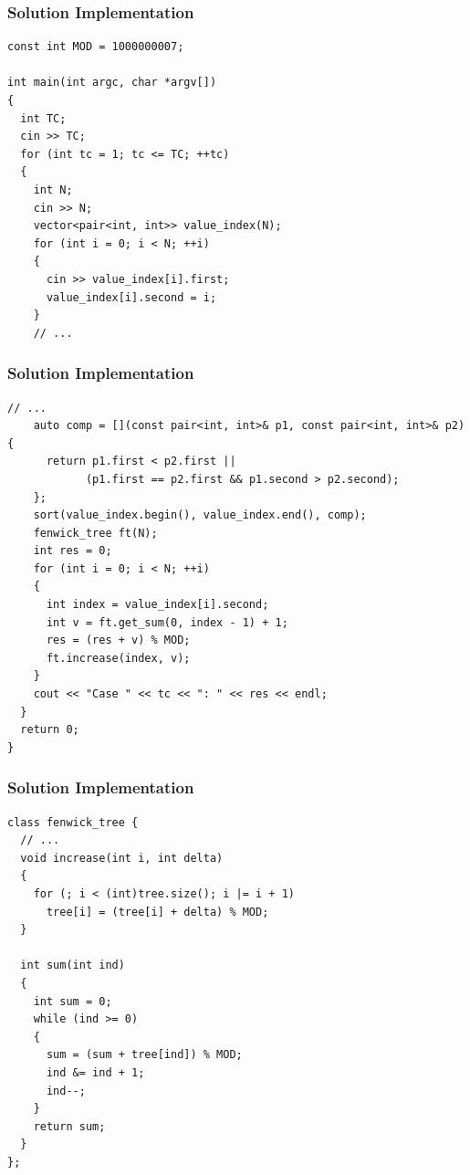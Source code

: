 \documentclass{beamer}
\begin{document}
\begin{frame}[containsverbatim]
\frametitle{Solution Implementation}

\scriptsize

\begin{lstlisting}[mathescape]
const int MOD = 1000000007;

int main(int argc, char *argv[])
{
  int TC;
  cin >> TC;
  for (int tc = 1; tc <= TC; ++tc)
  {
    int N;
    cin >> N;
    vector<pair<int, int>> value_index(N);
    for (int i = 0; i < N; ++i)
    {
      cin >> value_index[i].first;
      value_index[i].second = i;
    }
    // ...
\end{lstlisting}

\end{frame}

\begin{frame}[containsverbatim]
\frametitle{Solution Implementation}

\scriptsize

\begin{lstlisting}[mathescape]
    // ...
    auto comp = [](const pair<int, int>& p1, const pair<int, int>& p2) {
      return p1.first < p2.first ||
            (p1.first == p2.first && p1.second > p2.second);
    };
    sort(value_index.begin(), value_index.end(), comp);
    fenwick_tree ft(N);
    int res = 0;
    for (int i = 0; i < N; ++i)
    {
      int index = value_index[i].second;
      int v = ft.get_sum(0, index - 1) + 1;
      res = (res + v) % MOD;
      ft.increase(index, v);
    }
    cout << "Case " << tc << ": " << res << endl;
  }
  return 0;
}
\end{lstlisting}

\end{frame}

\begin{frame}[containsverbatim]
\frametitle{Solution Implementation}

\scriptsize

\begin{lstlisting}[mathescape]
class fenwick_tree {
  // ...
  void increase(int i, int delta)
  {
    for (; i < (int)tree.size(); i |= i + 1)
      tree[i] = (tree[i] + delta) % MOD;
  }

  int sum(int ind)
  {
    int sum = 0;
    while (ind >= 0)
    {
      sum = (sum + tree[ind]) % MOD;
      ind &= ind + 1;
      ind--;
    }
    return sum;
  }
};
\end{lstlisting}

\end{frame}
\end{document}
